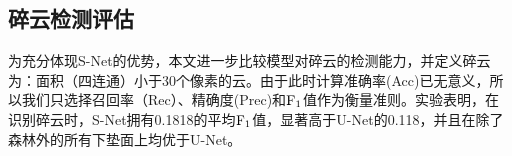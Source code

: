\documentclass[10pt]{ctexart}
\begin{document}
\begin{multicols}{2}


\subsection{碎云检测评估}
为充分体现S-Net的优势，本文进一步比较模型对碎云的检测能力，并定义碎云为：面积（四连通）小于30个像素的云。由于此时计算准确率(Acc)已无意义，所以我们只选择召回率（Rec）、精确度(Prec)和$\rm F_1$值作为衡量准则。实验表明，在识别碎云时，S-Net拥有0.1818的平均$\rm F_1$值，显著高于U-Net的0.118，并且在除了森林外的所有下垫面上均优于U-Net。

\end{multicols}
\end{document}
